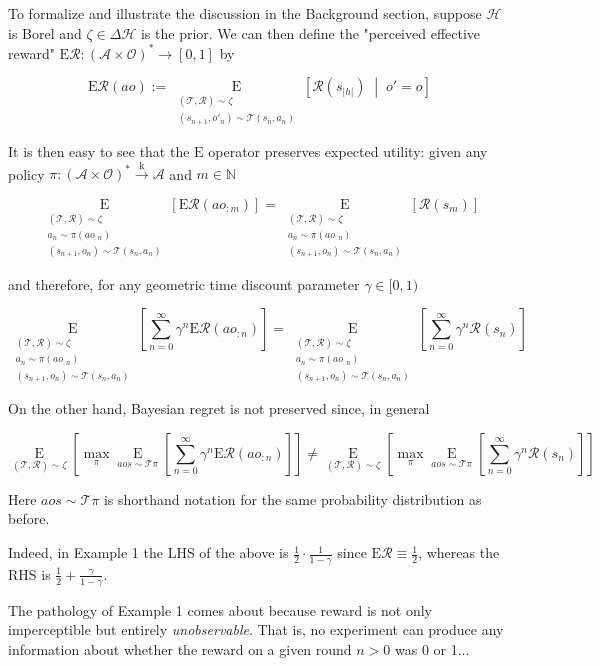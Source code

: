 \documentclass[a4paper]{article}
\newcommand{\Co}[1]{}
\newcommand{\AP}[1]{\left(#1\right)}
\newcommand{\AB}[1]{\left[#1\right]}
\newcommand{\ABM}[2]{\left[#1\;\middle\vert\;#2\right]}
\newcommand{\Ea}[2]{\underset{#1}{\operatorname{E}}\AB{#2}}
\newcommand{\CE}[3]{\underset{#1}{\operatorname{E}}\ABM{#2}{#3}}
\newcommand{\Nats}{\mathbb{N}}
\newcommand{\Abs}[1]{\left\vert #1 \right\vert}
\newcommand{\K}{\xrightarrow{\mathrm{k}}}
\newcommand{\A}{\mathcal{A}}
\newcommand{\Ob}{\mathcal{O}}
\newcommand{\R}{\mathcal{R}}
\newcommand{\T}{\mathcal{T}}
\newcommand{\Hy}{\mathcal{H}}
\newcommand{\ER}{\mathrm{E}}
\begin{document}
To formalize and illustrate the discussion in the Background section, suppose $\Hy$ is Borel and $\zeta\in\Delta\Hy$ is the prior. We can then define the "perceived effective reward" $\ER\R:\AP{\A\times\Ob}^*\rightarrow[0,1]$ by

$$\ER\R(ao):=\CE{\substack{(\T,\R)\sim\zeta\\\AP{s_{n+1},o'_n}\sim\T\AP{s_n,a_n}}}{\R\AP{s_{\Abs{h}}}}{o'=o}$$

It is then easy to see that the $\ER$ operator preserves expected utility: given any policy $\pi:\AP{\A\times\Ob}^*\K \A$ and $m\in\Nats$

$$\Ea{\substack{(\T,\R)\sim\zeta\\a_n\sim\pi\AP{ao_{:n}}\\\AP{s_{n+1},o_n}\sim\T\AP{s_n,a_n}}}{\ER\R\AP{ao_{:m}}}=\Ea{\substack{(\T,\R)\sim\zeta\\a_n\sim\pi\AP{ao_{:n}}\\\AP{s_{n+1},o_n}\sim\T\AP{s_n,a_n}}}{\R\AP{s_m}}$$

and therefore, for any geometric time discount parameter $\gamma\in[0,1)$

$$\Ea{\substack{(\T,\R)\sim\zeta\\a_n\sim\pi\AP{ao_{:n}}\\\AP{s_{n+1},o_n}\sim\T\AP{s_n,a_n}}}{\sum_{n=0}^\infty\gamma^n\ER\R\AP{ao_{:n}}}=\Ea{\substack{(\T,\R)\sim\zeta\\a_n\sim\pi\AP{ao_{:n}}\\\AP{s_{n+1},o_n}\sim\T\AP{s_n,a_n}}}{\sum_{n=0}^\infty\gamma^n\R\AP{s_n}}$$

On the other hand, Bayesian regret is not preserved since, in general

$$\Ea{(\T,\R)\sim\zeta}{\max_{\pi}\Ea{aos\sim\T\pi}{\sum_{n=0}^\infty\gamma^n\ER\R\AP{ao_{:n}}}}\ne\Ea{(\T,\R)\sim\zeta}{\max_{\pi}\Ea{aos\sim\T\pi}{\sum_{n=0}^\infty\gamma^n\R\AP{s_n}}}$$

Here $aos\sim\T\pi$ is shorthand notation for the same probability distribution as before.

Indeed, in Example 1 the LHS of the above is $\frac{1}{2}\cdot\frac{1}{1-\gamma}$ since $\ER\R\equiv\frac{1}{2}$, whereas the RHS is $\frac{1}{2}+\frac{\gamma}{1-\gamma}$.

The pathology of Example 1 comes about because reward is not only imperceptible but entirely \textit{unobservable}\Co{i}. That is, no experiment can produce any information about whether the reward on a given round $n > 0$ was 0 or 1...
\end{document}
